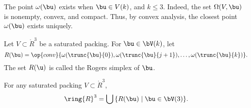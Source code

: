 The point $\omega(\bu)$ exists when $\bu\in V(k)$, and $k\le 3$.
Indeed, the set $\Omega(V, \bu)$ is nonempty, convex, and compact.  Thus, by
convex analysis, the closest point $\omega( \bu)$ exists uniquely.
%

\begin{definition}
Let $V\subset\ring{R}^3$ be a saturated packing. For $\bu\in \bV(k)$, let 
\begin{displaymath}
R(\bu) = \op{conv}\{\omega( \trunc{\bu}{0}), \omega(
\trunc{\bu}{j+1}),\ldots,\omega( \trunc{\bu}{k})\}.
\end{displaymath}
The set $R(\u)$ is called the Rogers simplex of $\bu$.
%
\end{definition}

\begin{lemma}
For any saturated packing $V\subset\ring{R}^3$, 
\begin{displaymath}\ring{R}^3 = \bigcup\, \{ R(\bu) \mid \bu\in
\bV(3)\}.\end{displaymath}
\end{lemma}

